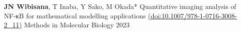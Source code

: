 \begin{cventries}

  \cventrypublast
    {\textbf{JN Wibisana}, T Inaba, Y Sako, M Okada*} %
    {Quantitative imaging analysis of NF-κB for mathematical modelling applications \href{https://doi.org/10.1007/978-1-0716-3008-2_11}{(doi:10.1007/978-1-0716-3008-2\_11)}} %
    {Methods in Molecular Biology} %
    {2023} %


\end{cventries}
